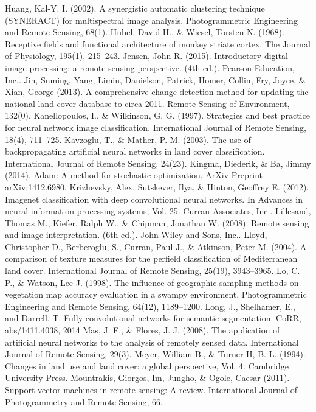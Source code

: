 \documentclass[letterpaper, 10 pt, conference]{ieeeconf}  %
\begin{document}
\begin{thebibliography}{99}
Huang, Kal-Y. I. (2002). A synergistic automatic clustering technique (SYNERACT) for multispectral image analysis. Photogrammetric Engineering and Remote Sensing, 68(1).
Hubel, David H., \& Wiesel, Torsten N. (1968). Receptive fields and functional architecture of monkey striate cortex. The Journal of Physiology, 195(1), 215–243. Jensen, John R. (2015). Introductory digital image processing: a remote sensing perspective. (4th ed.). Pearson Education, Inc..
Jin, Suming, Yang, Limin, Danielson, Patrick, Homer, Collin, Fry, Joyce, \& Xian, George
(2013). A comprehensive change detection method for updating the national land cover database to circa 2011. Remote Sensing of Environment, 132(0). Kanellopoulos, I., \& Wilkinson, G. G. (1997). Strategies and best practice for neural network image classification. International Journal of Remote Sensing, 18(4), 711–725.
Kavzoglu, T., \& Mather, P. M. (2003). The use of backpropagating artificial neural networks in land cover classification. International Journal of Remote Sensing, 24(23).
Kingma, Diederik, \& Ba, Jimmy (2014). Adam: A method for stochastic optimization, ArXiv Preprint arXiv:1412.6980.
Krizhevsky, Alex, Sutskever, Ilya, \& Hinton, Geoffrey E. (2012). Imagenet classification with deep convolutional neural networks. In Advances in neural information processing systems, Vol. 25. Curran Associates, Inc..
Lillesand, Thomas M., Kiefer, Ralph W., \& Chipman, Jonathan W. (2008). Remote sensing and image interpretation. (6th ed.). John Wiley and Sons, Inc..
Lloyd, Christopher D., Berberoglu, S., Curran, Paul J., \& Atkinson, Peter M. (2004). A comparison of texture measures for the perfield classification of Mediterranean land cover. International Journal of Remote Sensing, 25(19), 3943–3965.
Lo, C. P., \& Watson, Lee J. (1998). The influence of geographic sampling methods on vegetation map accuracy evaluation in a swampy environment. Photogrammetric Engineering and Remote Sensing, 64(12), 1189–1200.
Long, J., Shelhamer, E., and Darrell, T. Fully convolutional networks for semantic segmentation. CoRR,
abs/1411.4038, 2014
Mas, J. F., \& Flores, J. J. (2008). The application of artificial neural networks to the analysis of remotely sensed data. International Journal of Remote Sensing, 29(3). Meyer, William B., \& Turner II, B. L. (1994). Changes in land use and land cover: a global perspective, Vol. 4. Cambridge University Press.
Mountrakis, Giorgos, Im, Jungho, \& Ogole, Caesar (2011). Support vector machines in remote sensing: A review. International Journal of Photogrammetry and Remote Sensing, 66.

\end{thebibliography}
\end{document}
